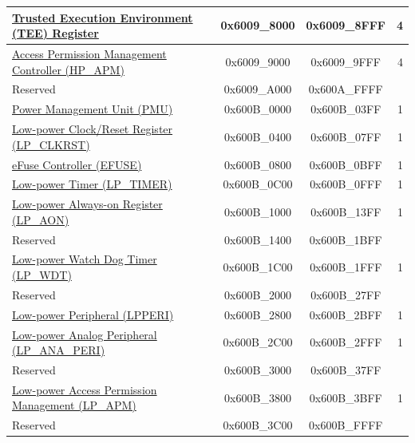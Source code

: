 \begin{ThreePartTable}
\begin{longtable}[c]{ |p{7cm}|c|c|r| }
\hyperref[mod:permctrl]{Trusted Execution Environment (TEE) Register}\tnote{\textcolor{red}{*}}                     & 0x6009\_8000 & 0x6009\_8FFF &   4 \\\hline
\hyperref[mod:permctrl]{Access Permission Management Controller (HP\_APM)}\tnote{\textcolor{red}{*}}                      & 0x6009\_9000 & 0x6009\_9FFF &   4 \\\hline
    \rowcolor{gray!25}  Reserved                    & 0x6009\_A000 & 0x600A\_FFFF &         \\\hline
\hyperref[mod:lowpowm]{Power Management Unit (PMU)} & 0x600B\_0000 & 0x600B\_03FF &   1     \\\hline
\hyperref[mod:resclk]{Low-power Clock/Reset Register (LP\_CLKRST)}                  & 0x600B\_0400 & 0x600B\_07FF &   1     \\\hline
\hyperref[mod:efuse]{eFuse Controller (EFUSE)}                       & 0x600B\_0800 & 0x600B\_0BFF &   1     \\\hline
\hyperref[mod:lowpowm]{Low-power Timer (LP\_TIMER)}                   & 0x600B\_0C00 & 0x600B\_0FFF &   1     \\\hline
\hyperref[mod:lowpowm]{Low-power Always-on Register (LP\_AON)}                     & 0x600B\_1000 & 0x600B\_13FF &   1     \\\hline
    \rowcolor{gray!25}  Reserved                    & 0x600B\_1400 & 0x600B\_1BFF &         \\\hline
\hyperref[mod:wdt]{Low-power Watch Dog Timer (LP\_WDT)}                     & 0x600B\_1C00 & 0x600B\_1FFF &   1     \\\hline
    \rowcolor{gray!25}  Reserved                    & 0x600B\_2000 & 0x600B\_27FF &         \\\hline
\hyperref[mod:resclk]{Low-power Peripheral (LPPERI)}                      & 0x600B\_2800 & 0x600B\_2BFF &   1     \\\hline
\hyperref[mod:lowpowm]{Low-power Analog Peripheral (LP\_ANA\_PERI)}               & 0x600B\_2C00 & 0x600B\_2FFF &   1     \\\hline
    \rowcolor{gray!25}  Reserved                    & 0x600B\_3000 & 0x600B\_37FF &         \\\hline
\hyperref[mod:permctrl]{Low-power Access Permission Management (LP\_APM)}\tnote{\textcolor{red}{*}}                     & 0x600B\_3800 & 0x600B\_3BFF &   1     \\\hline
    \rowcolor{gray!25}  Reserved                    & 0x600B\_3C00 & 0x600B\_FFFF &         \\\hline

\end{longtable}
\end{ThreePartTable}
